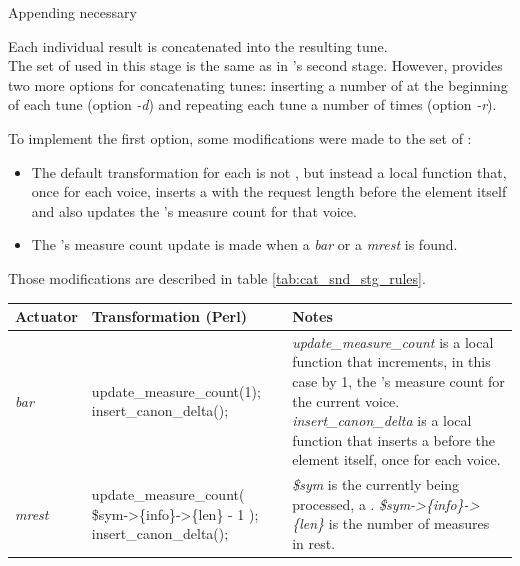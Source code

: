 \begin{enumerate}
\begin{program}
    \caption{Appending necessary \measurerests{}}
  \end{program}

  Each individual result is concatenated into the resulting tune.\\

  The set of \abcdtrules{} used in this stage is the same as in \pasteabc{}'s second stage. However,
  \catabc{} provides two more options for concatenating tunes: inserting a number of \measurerests{}
  at the beginning of each tune (option \emph{-d}) and repeating each tune a number of times (option
  \emph{-r}).

  To implement the first option, some modifications were made to the set of \abcdtrules{}:

  \begin{itemize}
    \item The default transformation for each \abcelement{} is not \toabc{}, but instead a local
    function that, once for each voice, inserts a \measurerest{} with the request length before the
    element itself and also updates the \context{}'s measure count for that voice.
    \item The \context{}'s measure count update is made when a \emph{bar} or a \emph{mrest} is
    found.
  \end{itemize}

  Those modifications are described in table \ref{tab:cat_snd_stg_rules}.

  \begin{center}
    \begin{table}[h]
      \begin{tabular}{|p{2.5cm}|p{4.75cm}|p{8cm}|}
        \hline
        Actuator & Transformation (Perl) & Notes\\
        \hline
        \hline
        \emph{bar} & update\_measure\_count(1); insert\_canon\_delta(); &
        \emph{update\_measure\_count} is a local function that increments, in this case by 1, the
        \context{}'s measure count for the current voice. \emph{insert\_canon\_delta} is a local
        function that inserts a \measurerest{} before the element itself, once for each voice.
        \\
        \hline

        \hline
        \emph{mrest} & update\_measure\_count( \$sym->\{info\}->\{len\} - 1 );
        insert\_canon\_delta(); &
        \emph{\$sym} is the \abcelement{} currently being processed, a \measurerest{}.
        \emph{\$sym->\{info\}->\{len\}} is the number of measures in rest.
        \\
        \hline


\end{tabular}
\end{table}
\end{center}
\end{enumerate}
